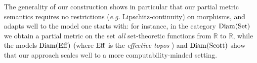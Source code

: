 The generality of our construction shows in particular that our partial metric semantics requires no restrictions (\textit{e.g.} Lipschitz-continuity) on morphisms, and adapts well to the model one starts with: for instance, in the category $\operatorname{Diam}(\operatorname{Set})$ we obtain a partial metric on the set \emph{all}  set-theoretic functions from $\mathbb R$ to $\mathbb R$, while the models $\operatorname{Diam}(\operatorname{Eff})$ (where $\operatorname{Eff}$ is the \emph{effective topos} \cite{hyland:effective-topos}) and $\operatorname{Diam}(\operatorname{Scott})$ show that our approach scales well to a more computability-minded setting.




%
%
%      
%
%

